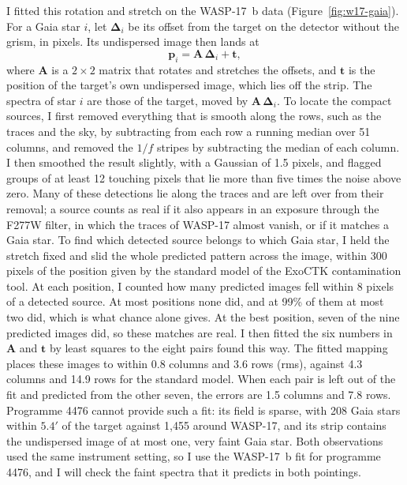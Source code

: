 I fitted this rotation and stretch on the WASP-17~b data
(Figure~\ref{fig:w17-gaia}). For a Gaia star $i$, let
$\boldsymbol{\Delta}_i$ be its offset from the target on the detector without
the grism, in pixels. Its undispersed image then lands at
\begin{equation}
  \mathbf{p}_i = \mathbf{A}\,\boldsymbol{\Delta}_i + \mathbf{t},
  \label{eq:gaia-map}
\end{equation}
where $\mathbf{A}$ is a $2\times2$ matrix that rotates and stretches the
offsets, and $\mathbf{t}$ is the position of the target's own undispersed
image, which lies off the strip. The spectra of star $i$ are those of the
target, moved by $\mathbf{A}\,\boldsymbol{\Delta}_i$. To locate the compact
sources, I first removed everything that is smooth along the rows, such as
the traces and the sky, by subtracting from each row a running median over 51
columns, and removed the $1/f$ stripes by subtracting the median of each
column. I then smoothed the result slightly, with a Gaussian of 1.5 pixels,
and flagged groups of at least 12 touching pixels that lie more than five
times the noise above zero. Many of these detections lie along the traces and
are left over from their removal; a source counts as real if it also appears
in an exposure through the F277W filter, in which the traces of WASP-17
almost vanish, or if it matches a Gaia star. To find which detected source
belongs to which Gaia star, I held the stretch fixed and slid the whole
predicted pattern across the image, within 300 pixels of the position given
by the standard model of the ExoCTK contamination tool. At each position, I
counted how many predicted images fell within 8 pixels of a detected source.
At most positions none did, and at 99\% of them at most two did, which is
what chance alone gives. At the best position, seven of the nine predicted
images did, so these matches are real. I then fitted the six numbers in
$\mathbf{A}$ and $\mathbf{t}$ by least squares to the eight pairs found this
way. The fitted mapping places these images to within 0.8 columns and 3.6 rows
(rms), against 4.3 columns and 14.9 rows for the standard model. When each pair
is left out of the fit and predicted from the other seven, the errors are 1.5
columns and 7.8 rows. Programme 4476 cannot provide such a fit: its field is
sparse, with 208 Gaia stars within $5.4'$ of the target against 1,455 around
WASP-17, and its strip contains the undispersed image of at most one, very
faint Gaia star. Both observations used the same instrument setting, so I use
the WASP-17~b fit for programme 4476, and I will check the faint spectra that
it predicts in both pointings.

